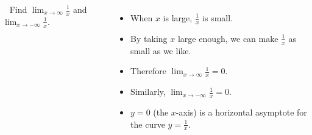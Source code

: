 \begin{frame}
\begin{example}[Example 2, p. 233]
\begin{columns}[c]
\ %
%
%
Find $\lim_{x\to\infty} \frac{1}{x}$ and $\lim_{x\to -\infty} \frac{1}{x}$.
\begin{itemize}
\item<2->  When $x$ is large, $\frac{1}{x}$ is small.
\item<3->  By taking $x$ large enough, we can make $\frac{1}{x}$ as small as we like.
\item<4->  Therefore $\lim_{x\to \infty} \frac{1}{x} = 0$.
\item<5->  Similarly, $\lim_{x\to -\infty}\frac{1}{x} = 0$.
\item<6->  $y = 0$ (the $x$-axis) is a horizontal asymptote for the curve $y = \frac{1}{x}$.
\end{itemize}
\end{columns}
\end{example}
\end{frame}
